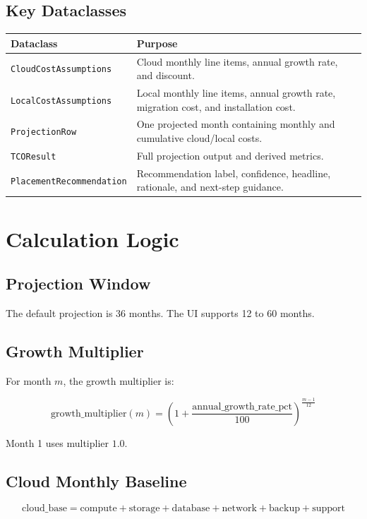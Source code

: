 \documentclass[11pt,a4paper]{article}
\begin{document}
\subsection{Key Dataclasses}

\begin{longtable}{p{}p{}}
\toprule
\textbf{Dataclass} & \textbf{Purpose} \\
\midrule
\texttt{CloudCostAssumptions} & Cloud monthly line items, annual growth rate, and discount. \\
\texttt{LocalCostAssumptions} & Local monthly line items, annual growth rate, migration cost, and installation cost. \\
\texttt{ProjectionRow} & One projected month containing monthly and cumulative cloud/local costs. \\
\texttt{TCOResult} & Full projection output and derived metrics. \\
\texttt{PlacementRecommendation} & Recommendation label, confidence, headline, rationale, and next-step guidance. \\
\bottomrule
\end{longtable}

\section{Calculation Logic}

\subsection{Projection Window}

The default projection is 36 months. The UI supports 12 to 60 months.

\subsection{Growth Multiplier}

For month \(m\), the growth multiplier is:

\[
\text{growth\_multiplier}(m) = \left(1 + \frac{\text{annual\_growth\_rate\_pct}}{100}\right)^{\frac{m - 1}{12}}
\]

Month 1 uses multiplier \(1.0\).

\subsection{Cloud Monthly Baseline}

\[
\text{cloud\_base} = \text{compute} + \text{storage} + \text{database} + \text{network} + \text{backup} + \text{support}
\]
\end{document}
